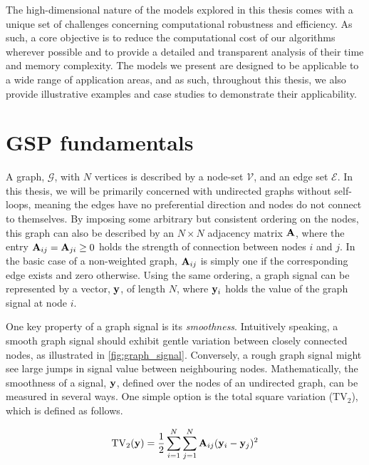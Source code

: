 
The high-dimensional nature of the models explored in this thesis comes with a unique set of challenges concerning computational robustness and efficiency. As such, a core objective is to reduce the computational cost of our algorithms wherever possible and to provide a detailed and transparent analysis of their time and memory complexity. The models we present are designed to be applicable to a wide range of application areas, and as such, throughout this thesis, we also provide illustrative examples and case studies to demonstrate their applicability. 

\newpage 


\section{GSP fundamentals}

\label{sec:fundamentals}

A graph, $\mathcal{G}$, with $N$ vertices is described by a node-set $\mathcal{V}$, and an edge set $\mathcal{E}$. In this thesis, we will be primarily concerned with undirected graphs without self-loops, meaning the edges have no preferential direction and nodes do not connect to themselves. By imposing some arbitrary but consistent ordering on the nodes, this graph can also be described by an $N \times N$ adjacency matrix $\mathbf{A}$, where the entry $\mathbf{A}_{ij} = \mathbf{A}_{ji} \geq 0$ holds the strength of connection between nodes $i$ and $j$. In the basic case of a non-weighted graph, $\mathbf{A}_{ij}$ is simply one if the corresponding edge exists and zero otherwise. Using the same ordering, a graph signal can be represented by a vector, $\mathbf{y}$, of length $N$, where $\mathbf{y}_i$ holds the value of the graph signal at node $i$. 

One key property of a graph signal is its \textit{smoothness}. Intuitively speaking, a smooth graph signal should exhibit gentle variation between closely connected nodes, as illustrated in \cref{fig:graph_signal}. Conversely, a rough graph signal might see large jumps in signal value between neighbouring nodes. Mathematically, the smoothness of a signal, $\mathbf{y}$, defined over the nodes of an undirected graph, can be measured in several ways. One simple option is the total square variation ($\text{TV}_2$), which is defined as follows. 

\begin{equation}
    \label{eq:TSV1}
    \text{TV}_2(\mathbf{y}) = \frac{1}{2}\sum_{i=1}^N \sum_{j=1}^N \mathbf{A}_{ij} (\mathbf{y}_i - \mathbf{y}_j)^2
\end{equation}

